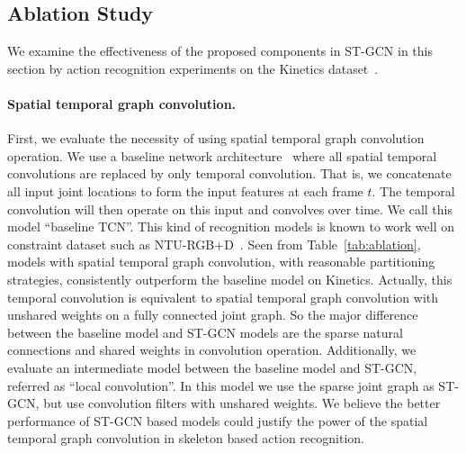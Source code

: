 \documentclass[letterpaper]{article} %
\begin{document}
\subsection{Ablation Study}\label{sec:ablation}
We examine the effectiveness of the proposed components in ST-GCN in this section by action recognition experiments on the Kinetics dataset~\cite{Kay2017Kinetics}.

\paragraph{Spatial temporal graph convolution.}
First, we evaluate the necessity of using spatial temporal graph convolution operation.
We use a baseline network architecture~\cite{Kim2017CVPRW} where all spatial temporal convolutions are replaced by only temporal convolution. That is, we concatenate all input joint locations to form the input features at each frame $ t $.
The temporal convolution will then operate on this input and convolves over time.
We call this model ``baseline TCN''.
This kind of recognition models is known to work well on constraint dataset such as NTU-RGB+D~\cite{Kim2017CVPRW}.
Seen from Table~\ref{tab:ablation}, models with spatial temporal graph convolution, with reasonable partitioning strategies, consistently outperform the baseline model on Kinetics.
Actually, this temporal convolution is equivalent to spatial temporal graph convolution with unshared weights on a fully connected joint graph.
So the major difference between the baseline model and ST-GCN models are the sparse natural connections and shared weights in convolution operation.
Additionally, we evaluate an intermediate model between the baseline model and ST-GCN, referred as ``local convolution''.
In this model we use the sparse joint graph as ST-GCN, but use convolution filters with unshared weights.
We believe the better performance of ST-GCN based models could justify the power of the spatial temporal graph convolution in skeleton based action recognition.
\end{document}
